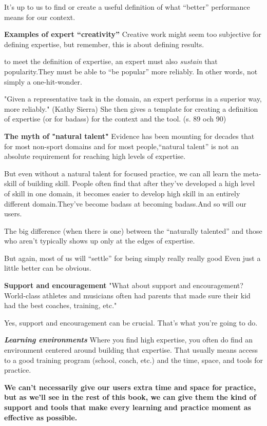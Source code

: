 It’s up to us to find or create a useful definition of what “better” performance means for our context.

\textbf{Examples of expert “creativity”}
Creative work might seem too subjective for defining expertise, but remember, this is about defining results.

to meet the definition of expertise, an expert must also \textit{sustain} that popularity.They must be able to “be popular” more reliably. In other words, not simply a one-hit-wonder.

"Given a representative task in the domain, an expert performs in a superior way, more reliably." (Kathy Sierra) She then gives a template for creating a definition of expertise (or for badass) for the context and the tool. (s. 89 och 90)

\textbf{The myth of "natural talent"}
Evidence has been mounting for decades that for most non-sport domains and for most people,“natural talent” is not an absolute requirement for reaching high levels of expertise.

But even without a natural talent for focused practice, we can all learn the meta-skill of building skill. People often find that after they’ve developed a high level of skill in one domain, it becomes easier to develop high skill in an entirely different domain.They’ve become badass at becoming badass.And so will our users.

The big difference (when there is one) between the “naturally talented” and those who aren’t typically shows up only at the edges of expertise.

But again, most of us will “settle” for being simply really really good
Even just a little better can be obvious.

\textbf{Support and encouragement}
"What about support and encouragement? World-class athletes and musicians often had parents that made sure their kid had the best coaches, training, etc."

Yes, support and encouragement can be crucial.
That’s what you’re going to do.

\textbf{\textit{Learning environments}}
Where you find high expertise, you often do find an environment centered around building that expertise.
That usually means access to a good training program (school, coach, etc.) and the time, space, and tools for practice.

\textbf{We can’t necessarily give our users extra time and space for practice, but as we’ll see in the rest of this book, we can give them the kind of support and tools that make every learning and practice moment as effective as possible.}

